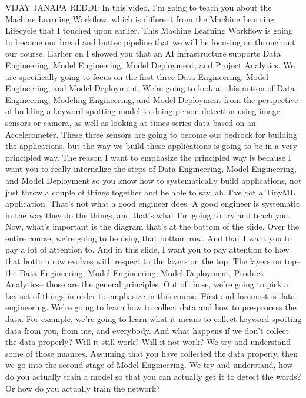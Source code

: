 VIJAY JANAPA REDDI: In this video, I'm going
to teach you about the Machine Learning Workflow, which
is different from the Machine Learning Lifecycle that I touched upon earlier.
This Machine Learning Workflow is going to become our bread and butter
pipeline that we will be focusing on throughout our course.
Earlier on I showed you that an AI infrastructure
supports Data Engineering, Model Engineering, Model Deployment,
and Project Analytics.
We are specifically going to focus on the first three
Data Engineering, Model Engineering, and Model Deployment.
We're going to look at this notion of Data Engineering, Modeling Engineering,
and Model Deployment from the perspective
of building a keyword spotting model to doing person detection using
image sensors or camera, as well as looking at times series data
based on an Accelerometer.
These three sensors are going to become our bedrock
for building the applications, but the way we build these applications
is going to be in a very principled way.
The reason I want to emphasize the principled way
is because I want you to really internalize
the steps of Data Engineering, Model Engineering, and Model Deployment
so you know how to systematically build applications, not just throw
a couple of things together and be able to say,
ah, I've got a TinyML application.
That's not what a good engineer does.
A good engineer is systematic in the way they do the things,
and that's what I'm going to try and teach you.
Now, what's important is the diagram that's at the bottom of the slide.
Over the entire course, we're going to be using that bottom row.
And that I want you to pay a lot of attention to.
And in this slide, I want you to pay attention
to how that bottom row evolves with respect to the layers on the top.
The layers on top-- the Data Engineering, Model Engineering,
Model Deployment, Product Analytics-- those are the general principles.
Out of those, we're going to pick a key set of things
in order to emphasize in this course.
First and foremost is data engineering.
We're going to learn how to collect data and how to pre-process the data.
For example, we're going to learn what it
means to collect keyword spotting data from you, from me, and everybody.
And what happens if we don't collect the data properly?
Will it still work?
Will it not work?
We try and understand some of those nuances.
Assuming that you have collected the data properly,
then we go into the second stage of Model Engineering.
We try and understand, how do you actually train a model so that you can
actually get it to detect the words?
Or how do you actually train the network?
